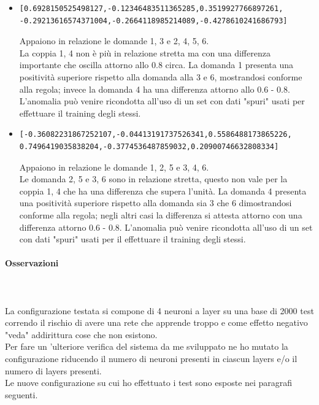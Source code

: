 \begin{itemize}
\item  \begin{verbatim}[0.6928150525498127,-0.12346483511365285,0.3519927766897261,
-0.29213616574371004,-0.2664118985214089,-0.4278610241686793]
\end{verbatim}
Appaiono in relazione le domande 1, 3 e 2, 4, 5, 6.\\
La coppia 1, 4 non \`e pi\`u in relazione stretta ma con una differenza importante che oscilla attorno allo 0.8 circa. La domanda 1 presenta una positivit\`a superiore rispetto alla domanda alla 3 e 6, mostrandosi  conforme alla regola; invece la domanda 4 ha una differenza  attorno allo 0.6 - 0.8. L'anomalia pu\`o venire ricondotta all'uso di un set con dati "spuri"  usati per effettuare il training degli stessi.

\item  \begin{verbatim}[-0.36082231867252107,-0.04413191737526341,0.5586488173865226,
0.7496419035838204,-0.3774536487859032,0.20900746632808334]
\end{verbatim}
Appaiono in relazione le domande 1, 2, 5 e 3, 4, 6.\\
Le domanda 2, 5 e 3, 6  sono in relazione stretta, questo non vale per la coppia 1, 4 che ha una differenza che supera l'unit\`a. La domanda 4 presenta una positivit\`a superiore rispetto alla domanda sia 3 che 6  dimostrandosi conforme alla regola; negli altri casi la differenza si attesta attorno con una differenza attorno 0.6 - 0.8. L'anomalia pu\`o venire ricondotta all'uso di un set con dati "spuri" usati per il effettuare il training degli stessi.
\end{itemize}

\paragraph{Osservazioni}\mbox{}
\label{Osservazioni su rete a 4 neuroni per ciascuno dei 2 layers}
\\\\
\noindent
La configurazione testata si compone di 4 neuroni a layer su una base di 2000 test correndo il rischio di avere una rete che apprende troppo e come effetto negativo "veda" addirittura cose che non esistono.\\
Per fare un 'ulteriore verifica del sistema da me sviluppato ne ho mutato la configurazione riducendo il numero di neuroni presenti in ciascun layers e/o il numero di layers presenti.\\
Le nuove configurazione su cui ho effettuato i test sono esposte nei paragrafi seguenti.


